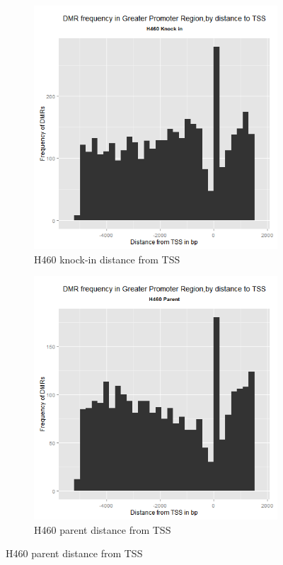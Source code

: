 \documentclass[11pt]{article}
\begin{document}
\begin{figure}[H]
\centering
\begin{subfigure}{.4\textwidth}
  \includegraphics[scale=0.45]{distribution_knocking_annotated_TSS_change.png}
  \caption{H460 knock-in distance from TSS}
  \label{fig:sub1}
\end{subfigure}
\quad
\begin{subfigure}{.4\textwidth}
  \includegraphics[scale=0.45]{distribution_parent_annotated_TSS_change.png}
  \caption{H460 parent distance from TSS}
  \label{fig:sub2}
\end{subfigure}

\label{fig:test}
\end{figure}
\end{document}
